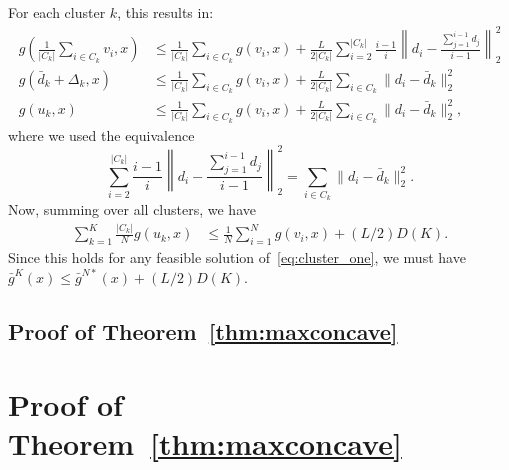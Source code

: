 \documentclass[12pt]{article}
\theoremstyle{thmstyleone}%
\theoremstyle{thmstyletwo}%
\theoremstyle{thmstylethree}%
\newcommand{\reviewChanges}{}
\begin{document}
\begin{appendices}
\reviewChanges{
For each cluster $k$, this results in:
\begin{align*}
	g \left(\frac{1}{|C_k|}\sum_{i \in C_k} v_i, x\right) &\leq  \frac{1}{|C_k|}\sum_{i \in C_k} g(v_i,x) + \frac{L}{2|C_k|} \sum_{i=2} ^{|C_k|} \frac{i-1}{i} \left \|d_i - \frac{\sum_{j=1}^{i-1}d_j}{i-1} \right \|^2_2\\
	 g(\bar{d}_k + \Delta_k,x) &\leq \frac{1}{|C_k|}\sum_{i \in C_k} g(v_i,x) + \frac{L}{2|C_k|} \sum_{i \in C_k} \|d_i - \bar{d}_k\|^2_2\\
	g(u_k,x) &\leq  \frac{1}{|C_k|}\sum_{i \in C_k} g(v_i,x) + \frac{L}{2|C_k|} \sum_{i \in C_k} \|d_i - \bar{d}_k\|^2_2,
\end{align*}
where we used the equivalence $$ \sum_{i=2} ^{|C_k|} \frac{i-1}{i} \left \|d_i - \frac{\sum_{j=1}^{i-1}d_j}{i-1} \right \|^2_2 =  \sum_{i \in C_k} \|d_i - \bar{d}_k\|^2_2. $$
Now, summing over all clusters, we have 
\begin{align*}
	\sum_{k = 1}^K \frac{|C_k|}{N}  g(u_k,x) &\leq \frac{1}{N} \sum_{i = 1}^N g(v_i,x) + (L/2) D(K).
\end{align*}
Since this holds for any feasible solution of~\eqref{eq:cluster_one}, we must have  $ {\bar{g}^K(x) \leq \bar{g}^{N*}(x) + (L/2) D(K)}$.
}


\ifpreprint
\subsection{Proof of Theorem~\ref{thm:maxconcave}}
\else
\section{Proof of Theorem~\ref{thm:maxconcave}}
\fi
\label{app:maxconcave}
\reviewChanges{
}
\end{appendices}
\end{document}
